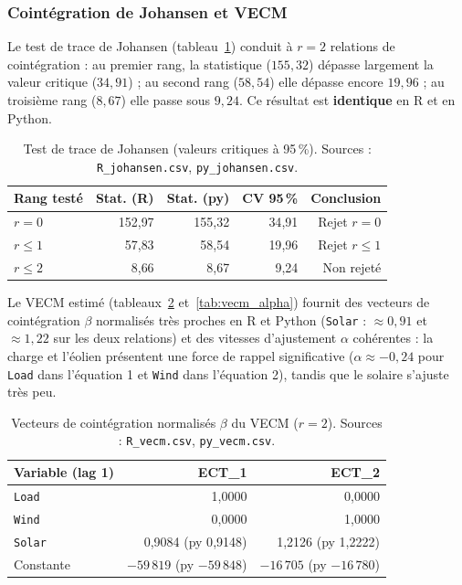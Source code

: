 \subsubsection{Cointégration de Johansen et VECM}
Le test de trace de Johansen (tableau~\ref{tab:johansen}) conduit à
\textbf{\(r=2\)} relations de cointégration : au premier rang, la statistique
(\(155{,}32\)) dépasse largement la valeur critique (\(34{,}91\)) ; au second
rang (\(58{,}54\)) elle dépasse encore \(19{,}96\) ; au troisième rang
(\(8{,}67\)) elle passe sous \(9{,}24\). Ce résultat est \textbf{identique} en
R et en Python.

\begin{table}[H]
\centering
\caption{Test de trace de Johansen (valeurs critiques à 95\,\%).
Sources : \texttt{R\_johansen.csv}, \texttt{py\_johansen.csv}.}
\label{tab:johansen}
\small
\begin{tabular}{lrrrr}
\toprule
Rang testé & Stat. (R) & Stat. (py) & CV 95\,\% & Conclusion \\
\midrule
$r=0$ & 152{,}97 & 155{,}32 & 34{,}91 & Rejet $r=0$ \\
$r\leq 1$ & 57{,}83 & 58{,}54 & 19{,}96 & Rejet $r\leq 1$ \\
$r\leq 2$ & 8{,}66 & 8{,}67 & 9{,}24 & Non rejeté \\
\bottomrule
\end{tabular}
\end{table}

Le VECM estimé (tableaux~\ref{tab:vecm} et~\ref{tab:vecm_alpha}) fournit des
vecteurs de cointégration \(\beta\) normalisés très proches en R et Python
(\texttt{Solar} : \(\approx 0{,}91\) et \(\approx 1{,}22\) sur les deux
relations) et des vitesses d'ajustement \(\alpha\) cohérentes : la charge et
l'éolien présentent une force de rappel significative
(\(\alpha \approx -0{,}24\) pour \texttt{Load} dans l'équation 1 et
\texttt{Wind} dans l'équation 2), tandis que le solaire s'ajuste très peu.

\begin{table}[H]
\centering
\caption{Vecteurs de cointégration normalisés $\beta$ du VECM
(\(r=2\)). Sources : \texttt{R\_vecm.csv}, \texttt{py\_vecm.csv}.}
\label{tab:vecm}
\small
\begin{tabular}{lrr}
\toprule
Variable (lag 1) & ECT\_1 & ECT\_2 \\
\midrule
\texttt{Load}  & 1{,}0000 & 0{,}0000 \\
\texttt{Wind}  & 0{,}0000 & 1{,}0000 \\
\texttt{Solar} & 0{,}9084 (py 0{,}9148) & 1{,}2126 (py 1{,}2222) \\
Constante      & $-59\,819$ (py $-59\,848$) & $-16\,705$ (py $-16\,780$) \\
\bottomrule
\end{tabular}
\end{table}

